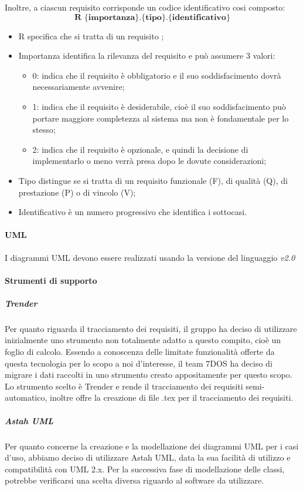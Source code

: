 Inoltre, a ciascun requisito corrisponde un codice identificativo cosi composto:
$$ \textbf{R \{importanza\}.\{tipo\}.\{identificativo\}  } $$
\begin{itemize}
	\item R specifica che si tratta di un requisito ;
	\item Importanza identifica la rilevanza del requisito e può assumere 3 valori:
	\begin{itemize}
		\item 0: indica che il requisito è obbligatorio e il suo soddisfacimento dovrà necessariamente avvenire;
		\item 1: indica che il requisito è desiderabile, cioè il suo soddisfacimento può portare maggiore completezza al sistema ma non è fondamentale per lo stesso;
		\item 2: indica che il requisito è opzionale, e quindi la decisione di implementarlo o meno verrà presa dopo le dovute considerazioni;
	\end{itemize}
	\item Tipo distingue se si tratta di un requisito funzionale (F), di qualità (Q), di prestazione (P) o di vincolo (V);
	\item Identificativo è un numero progressivo che identifica i sottocasi.
\end{itemize}
\paragraph{UML}\Spazio
I diagrammi UML devono essere realizzati usando la versione del linguaggio \emph{v2.0}
\paragraph{Strumenti di supporto}
\subparagraph{Trender}\Spazio
Per quanto riguarda il tracciamento dei requisiti, il gruppo ha deciso di utilizzare inizialmente uno strumento non totalmente adatto a questo compito, cioè un foglio di calcolo. Essendo a conoscenza delle limitate funzionalità offerte da questa tecnologia per lo scopo a noi d'interesse, il team 7DOS ha deciso di migrare i dati raccolti in uno strumento creato appositamente per questo scopo. Lo strumento scelto è Trender e rende il tracciamento dei requisiti semi-automatico, inoltre offre la creazione di file .tex per il tracciamento dei requisiti.
\subparagraph{Astah UML}\Spazio
Per quanto concerne la creazione e la modellazione dei diagrammi UML per i casi d'uso, abbiamo deciso di utilizzare Astah UML, data la sua facilità di utilizzo e compatibilità con UML 2.x. Per la successiva fase di modellazione delle classi, potrebbe verificarsi una scelta diversa riguardo al software da utilizzare.
